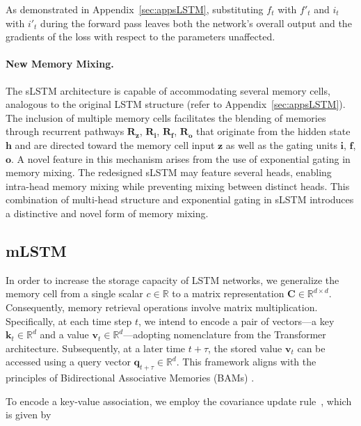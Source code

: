 As demonstrated in Appendix~\ref{sec:appsLSTM}, substituting $f_t$ with $f'_t$ and $i_t$ with $i'_t$ during the forward pass leaves both the network's overall output and the gradients of the loss with respect to the parameters unaffected.

\paragraph{New Memory Mixing.} The sLSTM architecture is capable of accommodating several memory cells, analogous to the original LSTM structure (refer to Appendix~\ref{sec:appsLSTM}). The inclusion of multiple memory cells facilitates the blending of memories through recurrent pathways $\mathbf{R}_{\mathbf{z}}$, $\mathbf{R}_{\mathbf{i}}$, $\mathbf{R}_{\mathbf{f}}$, $\mathbf{R}_{\mathbf{o}}$ that originate from the hidden state $\mathbf{h}$ and are directed toward the memory cell input $\mathbf{z}$ as well as the gating units $\mathbf{i}$, $\mathbf{f}$, $\mathbf{o}$. A novel feature in this mechanism arises from the use of exponential gating in memory mixing. The redesigned sLSTM may feature several heads, enabling intra-head memory mixing while preventing mixing between distinct heads. This combination of multi-head structure and exponential gating in sLSTM introduces a distinctive and novel form of memory mixing.

\subsection{mLSTM}
\label{sec:mLSTM}

In order to increase the storage capacity of LSTM networks, we generalize the memory cell from a single scalar $c \in \mathbb{R}$ to a matrix representation $\mathbf{C} \in \mathbb{R}^{d \times d}$. Consequently, memory retrieval operations involve matrix multiplication. Specifically, at each time step $t$, we intend to encode a pair of vectors—a key $\mathbf{k}_t \in \mathbb{R}^d$ and a value $\mathbf{v}_t \in \mathbb{R}^d$—adopting nomenclature from the Transformer architecture. Subsequently, at a later time $t + \tau$, the stored value $\mathbf{v}_t$ can be accessed using a query vector $\mathbf{q}_{t+\tau} \in \mathbb{R}^d$. This framework aligns with the principles of Bidirectional Associative Memories (BAMs) \citep{Kohonen:72,Anderson:72,Nakano:72,Anderson:77}.

To encode a key-value association, we employ the covariance update rule~\citep{Sejnowski:77,Dayan:91}, which is given by

